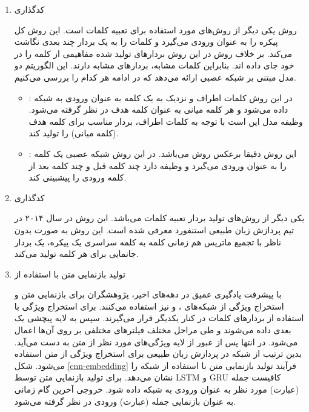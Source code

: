 \begin{enumerate}
\item کدگذاری

روش
\cite{41224}
یکی دیگر از روش‌های مورد استفاده برای تعبیه کلمات است. این روش کل پیکره را به عنوان ورودی می‌گیرد و کلمات را به یک بردار چند بعدی نگاشت می‌کند. بر خلاف روش
 در این روش بردارهای تولید شده مفاهیمی از کلمه را در خود جای دادە اند. بنابراین کلمات مشابه، بردارهای مشابه دارند. این الگوریتم دو مدل مبتنی بر شبکه عصبی ارائه  می‌دهد که در ادامه هر کدام را بررسی می‌کنیم.
 \begin{itemize}
 	\item {}:
 	در این روش کلمات اطراف و نزدیک به یک کلمه به عنوان ورودی به شبکه دادە می‌شود و هر کلمه میانی به عنوان کلمه هدف در نظر گرفته می‌شود. وظیفه مدل این است با توجه به کلمات اطراف، بردار مناسب برای کلمه هدف (کلمه میانی) را تولید کند.
 	\item {}:
 	این روش دقیقا برعکس روش  می‌باشد. در این روش شبکه عصبی یک کلمه را به عنوان ورودی می‌گیرد و وظیفه دارد چند کلمه قبل و چند کلمه بعد از کلمه ورودی را پیشبینی کند.
 	
 \end{itemize}
\item کدگذاری

یکی دیگر از روش‌های تولید بردار تعبیه کلمات
\cite{pennington-etal-2014-glove}
می‌باشد. این روش در سال ۲۰۱۴ در تیم پردازش زبان طبیعی استنفورد معرفی شده است. این روش به صورت بدون ناظر با تجمیع ماتریس هم زمانی
کلمه به کلمه سراسری 
 یک پیکره، یک بردار جانمایی برای هر کلمه تولید می‌کند.
 
 \item تولید بازنمایی متن با استفاده از 
 
 با پیشرفت یادگیری عمیق در دهە‌های اخیر، پژوهشگران برای بازنمایی متن و استخراج ویژگی از شبکەهای
  \cite{kim-2014-convolutional}،  و 
  نیز استفاده می‌کنند. برای استخراج ویژگی با استفاده از
  بردارهای کلمات در کنار یکدیگر قرار می‌گیرند. سپس به لایه پیچشی
یک بعدی داده می‌شوند و طی مراحل مختلف فیلترهای مختلفی بر روی آن‌ها اعمال می‌شود. در انتها پس از عبور از لایه
ویژگی‌های مورد نظر از متن به دست می‌آید. بدین ترتیب از شبکه
 در پردازش زبان طبیعی برای استخراج ویژگی از متن استفاده می‌شود. شکل 
 \ref{cnn-embedding}
 فرآیند تولید بازنمایی متن با استفاده از شبکه 
 را نشان می‌دهد. برای تولید بازنمایی متن توسط LSTM و GRU کافیست جمله (عبارت) مورد نظر به عنوان ورودی به شبکه داده شود. خروجی آخرین گام زمانی به عنوان بازنمایی جمله (عبارت) ورودی در نظر گرفته می‌شود.
 

\end{enumerate}
